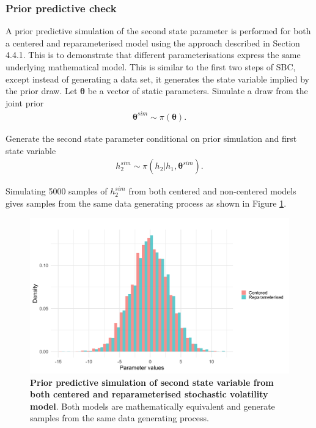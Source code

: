 \documentclass[12pt, a4paper]{article}
\begin{document}
    \subsubsection{Prior predictive check}
        A prior predictive simulation of the second state parameter is performed for both a centered and reparameterised model using the approach described in Section 4.4.1. This is to demonstrate that different parameterisations express the same underlying mathematical model. This is similar to the first two steps of SBC, except instead of generating a data set, it generates the state variable implied by the prior draw. Let $\boldsymbol{\theta}$ be a vector of static parameters. Simulate a draw from the joint prior
        \begin{align}
        \boldsymbol{\theta}^{sim} \sim \pi(\boldsymbol{\theta}).
        \end{align}

        Generate the second state parameter conditional on prior simulation and first state variable
        \begin{align}
        h_2^{sim} \sim \pi (h_2|h_1, \boldsymbol{\theta}^{sim}).
        \end{align}

        Simulating 5000 samples of $h_2^{sim}$ from both centered and non-centered models gives samples from the same data generating process as shown in Figure \ref{fig:priorpred}. 


        \begin{figure}[h]
            \centering
            \includegraphics[scale=0.1]{figures/ppc_h2.png}
            \caption{\textbf{Prior predictive simulation of second state variable from both centered and reparameterised stochastic volatility model}. Both models are mathematically equivalent and generate samples from the same data generating process.}
            \label{fig:priorpred}
        \end{figure}
        
\end{document}
